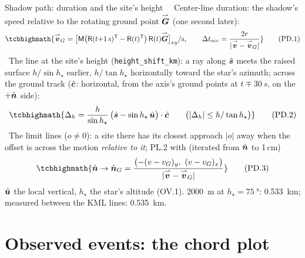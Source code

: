 \begin{frame}{Shadow path: duration and the site's height}
  \footnotesize\tightdisplays
  \OWN\ \SP\ Center-line duration: the shadow's speed relative to the rotating ground point $\overset{\rightharpoonup}{\bm{G}}$ (one second later):
  \[
    \tcbhighmath{\vv{v}_G = \bigl[\mathsf{M}\bigl(\mathsf{R}(t{+}1\,\mathrm{s})^{\mathsf T} - \mathsf{R}(t)^{\mathsf T}\bigr)\,\mathsf{R}(t)\vv{G}\bigr]_{xy}/\mathrm{s},
    \qquad
    \Delta t_{\mathrm{occ}} = \frac{2r}{|\vv{v} - \vv{v}_G|}}
    \tag{PD.1}
  \]
  \OWN\ The line at the site's height (\texttt{height\_shift\_km}): a ray along $\hat{\bm{s}}$ meets the raised surface
  $h/\sin h_\star$ earlier, $h/\tan h_\star$ horizontally toward the star's azimuth; across the ground track
  ($\hat{\bm{c}}$: horizontal, from the axis's ground points at $t \mp \SI{30}{s}$, on the $+\hat{\bm{n}}$ side):
  \[
    \tcbhighmath{\Delta_h = \frac{h}{\sin h_\star}\,\bigl(\uv{s} - \sin h_\star\,\uv{u}\bigr)\cdot\uv{c}
    \qquad\bigl(|\Delta_h| \le h / \tan h_\star\bigr)}
    \tag{PD.2}
  \]
  \OWN\ The limit lines ($o \ne 0$): a site there has its closest approach $|o|$ away when the offset is across the motion
  \emph{relative to it}; PL.2 with (iterated from $\hat{\bm{n}}$ to 1\,cm)
  \[
    \tcbhighmath{\uv{n} \to \uv{n}_G = \frac{\bigl(-(v - v_G)_y,\ (v - v_G)_x\bigr)}{|\vv{v} - \vv{v}_G|}}
    \tag{PD.3}
  \]
  {\small $\hat{\bm{u}}$ the local vertical, $h_\star$ the star's altitude (OV.1). \SI{2000}{m} at $h_\star = \SI{75}{\degree}$:
  \SI{0.533}{km}; measured between the KML lines: \SI{0.535}{km}.}
\end{frame}

\section{Observed events: the chord plot}

